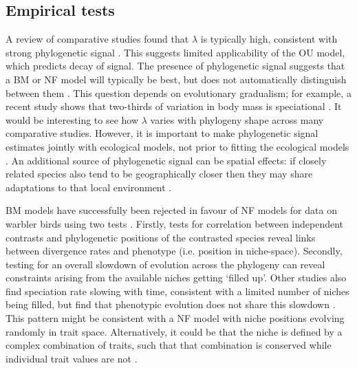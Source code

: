 \documentclass[12pt]{article}
\begin{document}
\subsection{Empirical tests}

A review of comparative studies found that $\lambda$ is typically high, consistent with strong phylogenetic signal \citep{freckleton_phylogenetic_2002}. 
This suggests limited applicability of the OU model, which predicts decay of signal. 
The presence of phylogenetic signal suggests that a BM or NF model will typically be best, but does not automatically distinguish between them \citep{cooper_phylogenetic_2010}. 
This question depends on evolutionary gradualism; for example, a recent study shows that two-thirds of variation in body mass is speciational \citep{Mattila&Bokma 2008}. 
It would be interesting to see how $\lambda$ varies with phylogeny shape across many comparative studies. 
However, it is important to make phylogenetic signal estimates jointly with ecological models, not prior to fitting the ecological models \citep{hansen_assessing_2005}. 
An additional source of phylogenetic signal can be spatial effects: if closely related species also tend to be geographically closer then they may share adaptations to that local environment \citep{garland_phylogenetic_2005}.

BM models have successfully been rejected in favour of NF models for data on warbler birds using two tests \citep{freckleton_detecting_2006}. 
Firstly, tests for correlation between independent contrasts \citep{felsenstein_phylogenies_1985} and phylogenetic positions of the contrasted species reveal links between divergence rates and phenotype (i.e. position in niche-space). 
Secondly, testing for an overall slowdown of evolution across the phylogeny can reveal constraints arising from the available niches getting `filled up'. 
Other studies also find speciation rate slowing with time, consistent with a limited number of niches being filled, but find that phenotypic evolution does not share this slowdown \citep{burbrink_evidence_2012}. 
This pattern might be consistent with a NF model with niche positions evolving randomly in trait space. 
Alternatively, it could be that the niche is defined by a complex combination of traits, such that that combination is conserved while individual trait values are not \citep{crisp_phylogenetic_2012}.
\end{document}

